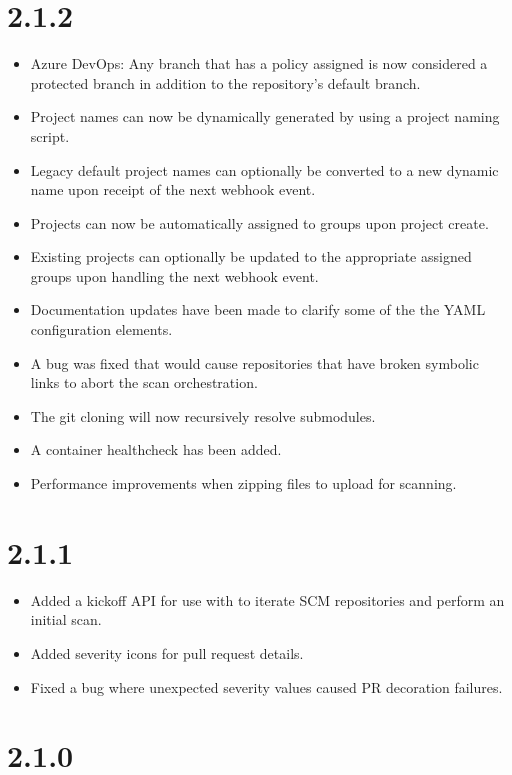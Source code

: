 \section{2.1.2}

\begin{itemize}
    \item Azure DevOps: Any branch that has a policy assigned is now considered
    a protected branch in addition to the repository's default branch.
    \item Project names can now be dynamically generated by using a project naming script.
    \item Legacy default project names can optionally be converted to a new dynamic name
    upon receipt of the next webhook event.
    \item Projects can now be automatically assigned to groups upon project create.
    \item Existing projects can optionally be updated to the appropriate assigned groups upon handling
    the next webhook event.
    \item Documentation updates have been made to clarify some of the the YAML configuration elements.
    \item A bug was fixed that would cause repositories that have broken symbolic links to abort the scan orchestration.
    \item The git cloning will now recursively resolve submodules.
    \item A container healthcheck has been added.
    \item Performance improvements when zipping files to upload for scanning.
\end{itemize}

\section{2.1.1}

\begin{itemize}
    \item Added a kickoff API for use with 
          to iterate SCM repositories and perform an initial scan.
    \item Added severity icons for pull request details.
    \item Fixed a bug where unexpected severity values caused PR decoration failures.
\end{itemize}


\section{2.1.0}

